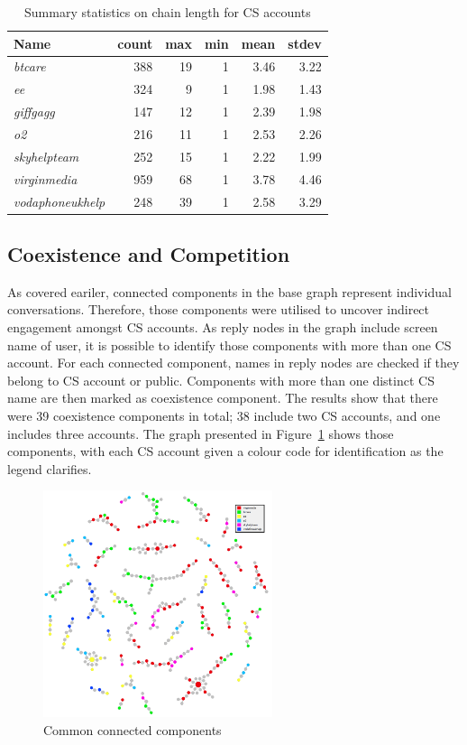\documentclass[sigconf]{acmart}
\begin{document}
{\begin{table}[!h]
\centering
\begin{tabularx}{\columnwidth}{lrrrrr}
\toprule
\textbf{Name} & \textbf{count} & \textbf{max} & \textbf{min} & \textbf{mean} & \textbf{stdev}\\ 
\midrule
{\emph{btcare}} & 388 & 19 & 1 & 3.46 & 3.22\\
{\emph{ee}} & 324 & 9 & 1 & 1.98 & 1.43\\
{\emph{giffgagg}} & 147 & 12 & 1 & 2.39 & 1.98\\ 
{\emph{o2}} & 216 & 11 & 1 & 2.53 & 2.26\\
{\emph{skyhelpteam}} & 252 & 15 & 1 & 2.22 & 1.99\\
{\emph{virginmedia}} & 959 & 68 & 1 & 3.78 & 4.46\\
{\emph{vodaphoneukhelp}} & 248 & 39 & 1 & 2.58 & 3.29\\
\bottomrule
\end{tabularx}
\caption{Summary statistics on chain length for CS accounts}
\label{tbl:delaystatscl}
\end{table}

\subsection{Coexistence and Competition}

As covered eariler, connected components in the base graph represent 
individual conversations. Therefore, those components were utilised to uncover 
indirect engagement amongst CS accounts. As reply nodes in the graph include 
screen name of user, it is possible to identify those components with 
more than one CS account. For each connected component, names in reply nodes
are checked if they belong to CS account or public. Components with more than
one distinct CS name are then marked as coexistence component. The results show
that there were 39 coexistence components in total; 38 include two CS accounts, and one
includes three accounts. The graph presented in
Figure~\ref{fig:commoncc} shows those components, with each CS account
given a colour code for identification as the legend clarifies.

\begin{figure}[htb]
\centering
\includegraphics[width=0.6\textwidth]{images/commoncc.png}
\caption{Common connected components}
\label{fig:commoncc}
\end{figure}

}
\end{document}

